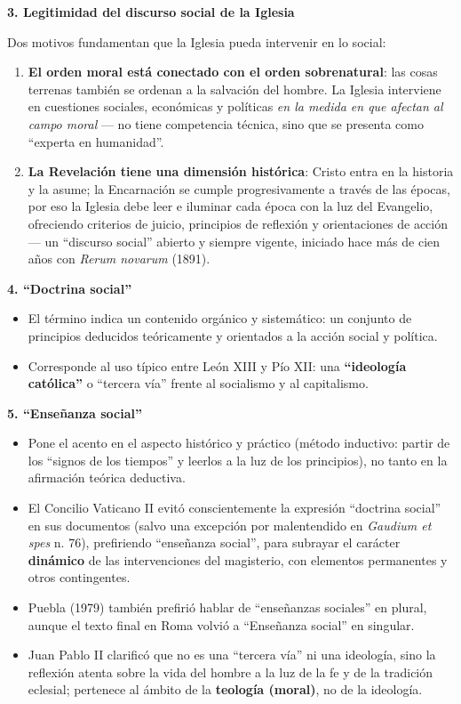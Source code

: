 \documentclass[10pt,a4paper]{article}
\begin{document}
\medskip\noindent \textbf{3. Legitimidad del discurso social de la Iglesia}\par\nopagebreak
\noindent Dos motivos fundamentan que la Iglesia pueda intervenir en lo social:\par\smallskip
\begin{enumerate}
\item \textbf{El orden moral está conectado con el orden sobrenatural}: las cosas terrenas también se ordenan a la salvación del hombre. La Iglesia interviene en cuestiones sociales, económicas y políticas \textit{en la medida en que afectan al campo moral} --- no tiene competencia técnica, sino que se presenta como ``experta en humanidad''.
\item \textbf{La Revelación tiene una dimensión histórica}: Cristo entra en la historia y la asume; la Encarnación se cumple progresivamente a través de las épocas, por eso la Iglesia debe leer e iluminar cada época con la luz del Evangelio, ofreciendo criterios de juicio, principios de reflexión y orientaciones de acción --- un ``discurso social'' abierto y siempre vigente, iniciado hace más de cien años con \textit{Rerum novarum} (1891).
\end{enumerate}

\medskip\noindent \textbf{4. ``Doctrina social''}\par\nopagebreak
\begin{itemize}
\item El término indica un contenido orgánico y sistemático: un conjunto de principios deducidos teóricamente y orientados a la acción social y política.
\item Corresponde al uso típico entre León XIII y Pío XII: una \textbf{``ideología católica''} o ``tercera vía'' frente al socialismo y al capitalismo.
\end{itemize}

\medskip\noindent \textbf{5. ``Enseñanza social''}\par\nopagebreak
\begin{itemize}
\item Pone el acento en el aspecto histórico y práctico (método inductivo: partir de los ``signos de los tiempos'' y leerlos a la luz de los principios), no tanto en la afirmación teórica deductiva.
\item El Concilio Vaticano II evitó conscientemente la expresión ``doctrina social'' en sus documentos (salvo una excepción por malentendido en \textit{Gaudium et spes} n. 76), prefiriendo ``enseñanza social'', para subrayar el carácter \textbf{dinámico} de las intervenciones del magisterio, con elementos permanentes y otros contingentes.
\item Puebla (1979) también prefirió hablar de ``enseñanzas sociales'' en plural, aunque el texto final en Roma volvió a ``Enseñanza social'' en singular.
\item Juan Pablo II clarificó que no es una ``tercera vía'' ni una ideología, sino la reflexión atenta sobre la vida del hombre a la luz de la fe y de la tradición eclesial; pertenece al ámbito de la \textbf{teología (moral)}, no de la ideología.
\end{itemize}
\end{document}
